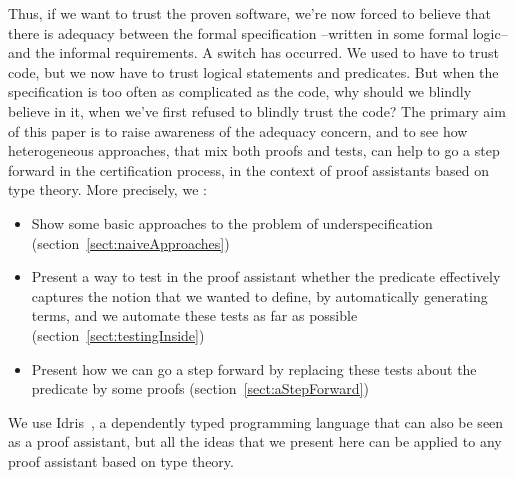 Thus, if we want to trust the proven software, we're now forced to believe that there is adequacy between the formal specification --written in some formal logic-- and the informal requirements. A switch has occurred. We used to have to trust code, but we now have to trust logical statements and predicates. But when the specification is too often as complicated as the code, why should we blindly believe in it, when we've first refused to blindly trust the code? The primary aim of this paper is to raise awareness of the adequacy concern, and to see how heterogeneous approaches, that mix both proofs and tests, can help to go a step forward in the certification process, in the context of proof assistants based on type theory.
More precisely, we :
\begin{itemize}
	\item Show some basic approaches to the problem of underspecification (section~\ref{sect:naiveApproaches})
	\item Present a way to test in the proof assistant whether the predicate effectively captures the notion that we wanted to define, by automatically generating terms, and we automate these tests as far as possible (section~\ref{sect:testingInside})
	\item Present how we can go a step forward by replacing these tests about the predicate by some proofs (section~\ref{sect:aStepForward})
\end{itemize}

We use Idris~\cite{brady2013idris}, a dependently typed programming language that can also be seen as a proof assistant, but all the ideas that we present here can be applied to any proof assistant based on type theory.

